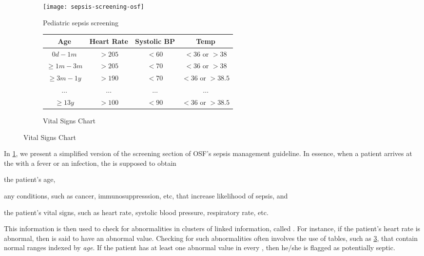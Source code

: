\begin{figure}
  \begin{subfigure}[b]{0.5\textwidth}
    \centering
    \texttt{[image: sepsis-screening-osf]}
    \caption{Pediatric sepsis screening \BPG{}}\label{fig:sepsis-screening}
  \end{subfigure}
  \begin{subfigure}[b]{0.3\textwidth}
    \tiny
      \begin{tabular}{ | c || c | c | c | }
        \hline
        \textbf{Age}            & \textbf{Heart Rate}   & \textbf{Systolic BP} & \textbf{Temp}  \\
        \hline
        $0d - 1m$               & $>205$                & $<60$                & $<36 \text{ or } >38$ \\
        \hline
        $\geq 1m - 3m$          & $>205$                & $<70$                & $<36 \text{ or } >38$ \\
        \hline
        $\geq 3m - 1y$          & $>190$                & $<70$                & $<36 \text{ or } >38.5$ \\
        \hline
        $\dots$                 & $\dots$               & $\dots$              & $\dots$ \\
        \hline
        $\geq 13y$              & $>100$                & $<90$                & $<36 \text{ or } >38.5$ \\
        \hline
      \end{tabular}
      \caption{Vital Signs Chart}\label{table:vital-signs}
  \end{subfigure}
\end{figure}

In \figurename{} \ref{fig:sepsis-screening}, we present a simplified version of
the screening section of OSF's sepsis management guideline.
In essence, when a patient arrives at the
\ED{} with a fever or an infection, the \HCP{} is supposed to obtain
\begin{enumerate*}[label=(\alph*)]
  \item the patient's age,
  \item any conditions, such as cancer, immunosuppresssion, etc,
    that increase likelihood of sepsis, and
  \item the patient's vital signs, such as heart rate, systolic blood
    pressure, respiratory rate, etc.
\end{enumerate*}
This information is then used to check for abnormalities
in clusters of linked information, called . For instance, if
the patient's heart rate is abnormal, then  is said to
have an abnormal value.
Checking for such abnormalities often involves the use of tables, such as
\tablename{} \ref{table:vital-signs}, that contain normal ranges indexed by
\emph{age}.
If the patient has at least one abnormal value in every ,
then he/she is flagged as potentially septic.

